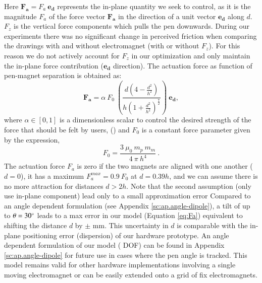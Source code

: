 Here $\mathbf{F_a} = F_a \ \mathbf{e_d}$ represents the in-plane quantity we seek to control, as it is the magnitude $F_a$ of the force vector $\mathbf{F_a}$ in the direction of a unit vector $\mathbf{e_d}$ along $d$.
$F_z$ is the vertical force components which pulls the pen downwards. 
During our experiments there was no significant change in perceived friction when comparing the drawings with and without electromagnet (\ie with or without $F_z$). 
For this reason we do not actively account for $F_z$ in our optimization and only maintain the in-plane force contribution ($\mathbf{e_d}$ direction).
%
The actuation force as function of pen-magnet separation is obtained as:
%
\begin{equation}
    \mathbf{F_a} = \alpha \ F_0 \ \left( \frac{d \left(4 - \frac{d^2}{h^2}\right)}{h \left(1 + \frac{d^2}{h^2}\right)^\frac{7}{2}} \right)  \ \mathbf{e_d} , \label{eq:Fa}
\end{equation}
%
where  $\alpha \in \left[0,1\right]$ is a dimensionless scalar to control the desired strength of the force that should be felt by users,  () and $F_0$ is a constant force parameter given by the expression,
\begin{equation}
 F_0 = \frac{3 \ \mu_0 \ m_p \ m_m}{4 \ \pi \ h^4} \ . \label{eq:F0}
\end{equation}
%
The actuation force $F_a$ is zero if the two magnets are aligned with one another ($d=0$), it has a maximum $F_a^{max} = 0.9 \ F_0$ at $d=0.39h$, and we can assume there is no more attraction for distances $d>2h$. 
Note that the second assumption (only use in-plane component) lead only to a small approximation error
Compared to an angle dependent formulation (see Appendix \ref{sc:ap.angle-dipole}), a tilt of up to $\theta = 30^{\circ}$ leads to a max error in our model (Equation \ref{eq:Fa}) equivalent to shifting the distance $d$ by $\pm$ \unit[3]{mm}. 
This uncertainty in $d$ is comparable with the in-plane positioning error (dispersion) of our hardware prototype.
An angle dependent formulation of our model ( DOF) can be found in Appendix \ref{sc:ap.angle-dipole} for future use in cases where the pen angle is tracked. 
This model remains valid for other hardware implementations involving a single moving electromagnet or can be easily extended onto a grid of fix electromagnets.




